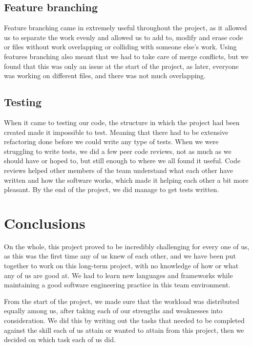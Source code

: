 \documentclass{l3proj}
\begin{document}
\subsection{Feature branching}
Feature branching came in extremely useful throughout the project, as it allowed us to separate the work evenly and allowed us to add to, modify and erase code or files without work overlapping or colliding with someone else’s work. Using features branching also meant that we had to take care of merge conflicts, but we found that this was only an issue at the start of the project, as later, everyone was working on different files, and there was not much overlapping.

\subsection{Testing}
When it came to testing our code, the structure in which the project had been created made it impossible to test. Meaning that there had to be extensive refactoring done before we could write any type of tests. When we were struggling to write tests, we did a few peer code reviews, not as much as we should have or hoped to, but still enough to where we all found it useful. Code reviews helped other members of the team understand what each other have written and how the software works, which made it helping each other a bit more pleasant. By the end of the project, we did manage to get tests written.


\section{Conclusions}

On the whole, this project proved to be incredibly challenging for every one of us, as this was the first time any of us knew of each other, and we have been put together to work on this long-term project, with no knowledge of how or what any of us are good at. We had to learn new languages and frameworks while maintaining a good software engineering practice in this team environment.

From the start of the project, we made sure that the workload was distributed equally among us, after taking each of our strengths and weaknesses into consideration. We did this by writing out the tasks that needed to be completed against the skill each of us attain or wanted to attain from this project, then we decided on which task each of us did. 
\end{document}
